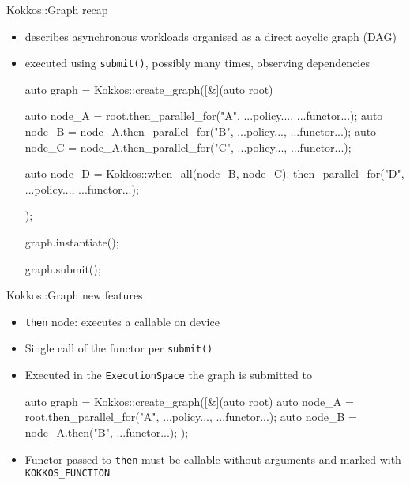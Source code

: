 


\begin{frame}[fragile]{Kokkos::Graph recap}
 \begin{itemize}
     \item describes asynchronous workloads organised as a direct acyclic graph (DAG)
     \item executed using \texttt{submit()}, possibly many times, observing dependencies
      \begin{code}[keywords={auto}]
auto graph = Kokkos::create_graph([&](auto root) {
    auto node_A = root.then_parallel_for("A", ...policy..., ...functor...);
    auto node_B = node_A.then_parallel_for("B", ...policy..., ...functor...);
    auto node_C = node_A.then_parallel_for("C", ...policy..., ...functor...);

    auto node_D = Kokkos::when_all(node_B, node_C).
                  then_parallel_for("D", ...policy..., ...functor...);
});

graph.instantiate();

graph.submit();
      \end{code}
 \end{itemize}
\end{frame}

\begin{frame}[fragile]{Kokkos::Graph new features}
 \begin{itemize}
  \item \texttt{then} node: executes a callable on device
  \item Single call of the functor per \texttt{submit()}
   \item Executed in the \texttt{ExecutionSpace} the graph is submitted to
     \begin{code}[keywords={auto}]
auto graph = Kokkos::create_graph([&](auto root) {
    auto node_A = root.then_parallel_for("A", ...policy..., ...functor...);
    auto node_B = node_A.then("B", ...functor...);
});   
     \end{code}
   \item Functor passed to \texttt{then} must be callable without arguments and marked with \texttt{KOKKOS\_FUNCTION}
 \end{itemize}
\end{frame}

